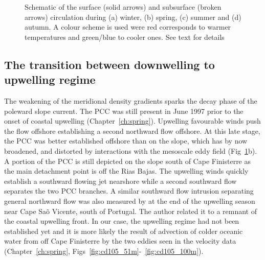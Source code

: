 \begin{figure}
\centering \arribacap%
%
%
\caption{Schematic of the surface (solid arrows) and subsurface
(broken arrows) circulation during (a) winter, (b) spring, (c)
summer and (d) autumn. A colour scheme is used were red
corresponds to warmer temperatures and green/blue to cooler ones.
See text for details } \label{fig:concl_sketch}
\end{figure}

\subsection{The transition between downwelling to upwelling regime}
The weakening of the meridional density gradients sparks the decay
phase of the poleward slope current. The PCC was still present in
June 1997 prior to the onset of coastal upwelling
(Chapter~\ref{ch:spring}). Upwelling favourable winds push the
flow offshore establishing a second northward flow offshore. At
this late stage, the PCC was better established offshore than on
the slope, which has by now broadened, and distorted by
interactions with the mesoscale eddy field
(Fig~\ref{fig:concl_sketch}b). A portion of the PCC is still
depicted on the slope south of Cape Finisterre as the main
detachment point is off the Rias Bajas. The upwelling winds
quickly establish a southward flowing jet nearshore while a second
southward flow separates the two PCC branches. A similar southward
flow intrusion separating general northward flow was also measured
by \citet{Almeida99} at the end of the upwelling season near Cape
Sa\~o Vicente, south of Portugal. The author related it to a
remnant of the coastal upwelling front. In our case, the upwelling
regime had not been established yet and it is more likely the
result of advection of colder oceanic water from off Cape
Finisterre by the two eddies seen in the velocity data
(Chapter~\ref{ch:spring},
Figs~\ref{fig:cd105_51m}-~\ref{fig:cd105_100m}).


